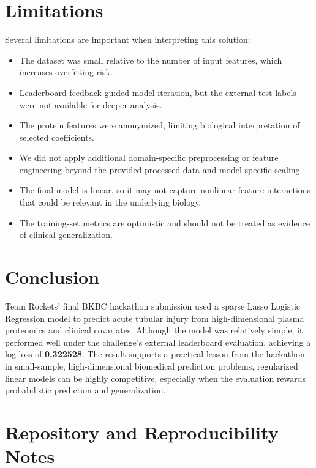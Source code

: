 \documentclass[11pt]{article}
\begin{document}
\section{Limitations}

Several limitations are important when interpreting this solution:

\begin{itemize}
    \item The dataset was small relative to the number of input features, which increases overfitting risk.
    \item Leaderboard feedback guided model iteration, but the external test labels were not available for deeper analysis.
    \item The protein features were anonymized, limiting biological interpretation of selected coefficients.
    \item We did not apply additional domain-specific preprocessing or feature engineering beyond the provided processed data and model-specific scaling.
    \item The final model is linear, so it may not capture nonlinear feature interactions that could be relevant in the underlying biology.
    \item The training-set metrics are optimistic and should not be treated as evidence of clinical generalization.
\end{itemize}


\section{Conclusion}

Team Rockets' final BKBC hackathon submission used a sparse Lasso Logistic Regression model to predict acute tubular injury from high-dimensional plasma proteomics and clinical covariates. Although the model was relatively simple, it performed well under the challenge's external leaderboard evaluation, achieving a log loss of \textbf{0.322528}. The result supports a practical lesson from the hackathon: in small-sample, high-dimensional biomedical prediction problems, regularized linear models can be highly competitive, especially when the evaluation rewards probabilistic prediction and generalization.

\appendix

\section{Repository and Reproducibility Notes}
\end{document}
